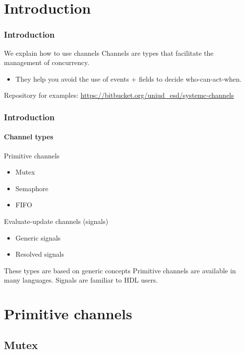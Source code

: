 \section{Introduction}

\begin{frame}
\frametitle{Introduction}
\begin{block}{We explain how to use channels}
Channels are types that facilitate the management of concurrency.
\begin{itemize}
\item They help you avoid the use of events + fields to decide who-can-act-when.
\end{itemize}
\end{block}
\pause
\begin{block}{Repository for examples:}
\url{https://bitbucket.org/uniud_esd/systemc-channels}
\end{block}
\end{frame}

\begin{frame}
\frametitle{Introduction}
\framesubtitle{Channel types}
\begin{block}{Primitive channels}
\begin{itemize}
\item Mutex
\item Semaphore
\item FIFO
\end{itemize}
\end{block}
\pause
\begin{block}{Evaluate-update channels (signals)}
\begin{itemize}
\item Generic signals
\item Resolved signals
\end{itemize}
\end{block}
\pause
\begin{block}{These types are based on generic concepts}
Primitive channels are available in many languages. Signals are familiar to HDL users.
\end{block}

\end{frame}

\section{Primitive channels}

\subsection{Mutex}

